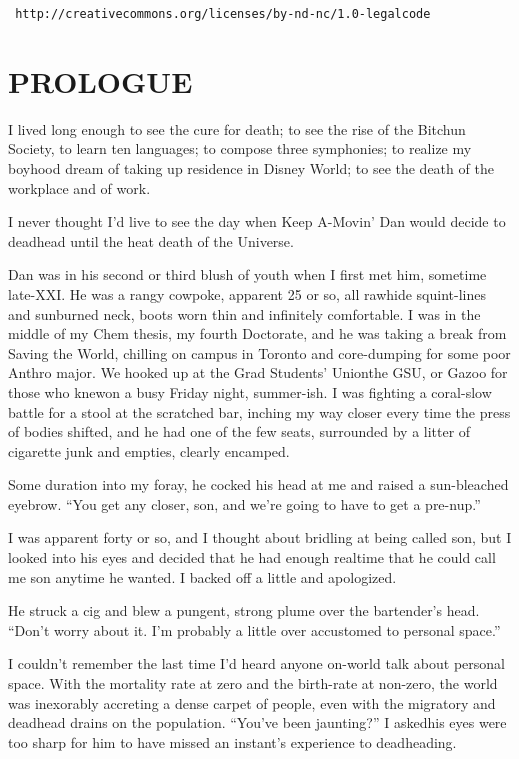 \texttt{\footnotesize 
http://creativecommons.org/licenses/by-nd-nc/1.0-legalcode}

\section{PROLOGUE}

I lived long enough to see the cure for death; to see the rise of
the Bitchun Society, to learn ten languages; to compose three
symphonies; to realize my boyhood dream of taking up residence in
Disney World; to see the death of the workplace and of work.

I never thought I'd live to see the day when Keep A-Movin' Dan
would decide to deadhead until the heat death of the Universe.

Dan was in his second or third blush of youth when I first met him,
sometime late-XXI. He was a rangy cowpoke, apparent 25 or so, all
rawhide squint-lines and sunburned neck, boots worn thin and
infinitely comfortable. I was in the middle of my Chem thesis, my
fourth Doctorate, and he was taking a break from Saving the World,
chilling on campus in Toronto and core-dumping for some poor Anthro
major. We hooked up at the Grad Students' Union{\dash}the GSU, or Gazoo
for those who knew{\dash}on a busy Friday night, summer-ish. I was
fighting a coral-slow battle for a stool at the scratched bar,
inching my way closer every time the press of bodies shifted, and
he had one of the few seats, surrounded by a litter of cigarette
junk and empties, clearly encamped.

Some duration into my foray, he cocked his head at me and raised a
sun-bleached eyebrow. “You get any closer, son, and we're going to
have to get a pre-nup.”

I was apparent forty or so, and I thought about bridling at being
called son, but I looked into his eyes and decided that he had
enough realtime that he could call me son anytime he wanted. I
backed off a little and apologized.

He struck a cig and blew a pungent, strong plume over the
bartender's head. “Don't worry about it. I'm probably a little over
accustomed to personal space.”

I couldn't remember the last time I'd heard anyone on-world talk
about personal space. With the mortality rate at zero and the
birth-rate at non-zero, the world was inexorably accreting a dense
carpet of people, even with the migratory and deadhead drains on
the population. “You've been jaunting?” I asked{\dash}his eyes were too
sharp for him to have missed an instant's experience to
deadheading.


